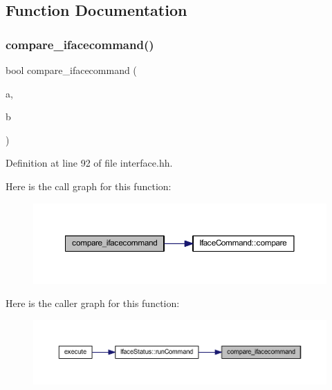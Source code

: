 \subsection{Function Documentation}
\mbox{\label{interface_8hh_af88fae35f618feee9303bf7d688365bb}} 
\subsubsection{\texorpdfstring{compare\_ifacecommand()}{compare\_ifacecommand()}}
{\footnotesize\ttfamily bool compare\+\_\+ifacecommand (\begin{DoxyParamCaption}\item[{const \mbox{\hyperlink{class_iface_command}{Iface\+Command}} $\ast$}]{a,  }\item[{const \mbox{\hyperlink{class_iface_command}{Iface\+Command}} $\ast$}]{b }\end{DoxyParamCaption})\hspace{0.3cm}{\ttfamily [inline]}}



Definition at line 92 of file interface.\+hh.

Here is the call graph for this function\+:
\nopagebreak
\begin{figure}[H]
\begin{center}
\leavevmode
\includegraphics[width=350pt]{interface_8hh_af88fae35f618feee9303bf7d688365bb_cgraph}
\end{center}
\end{figure}
Here is the caller graph for this function\+:
\nopagebreak
\begin{figure}[H]
\begin{center}
\leavevmode
\includegraphics[width=350pt]{interface_8hh_af88fae35f618feee9303bf7d688365bb_icgraph}
\end{center}
\end{figure}
